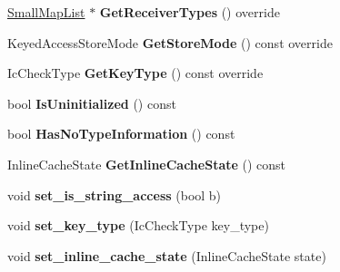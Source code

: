 \begin{DoxyCompactItemize}
\item 
\hyperlink{classv8_1_1internal_1_1_small_map_list}{Small\+Map\+List} $\ast$ {\bfseries Get\+Receiver\+Types} () override\hypertarget{classv8_1_1internal_1_1_property_a1def6a01b668036bf384f768d7e463d4}{}\label{classv8_1_1internal_1_1_property_a1def6a01b668036bf384f768d7e463d4}

\item 
Keyed\+Access\+Store\+Mode {\bfseries Get\+Store\+Mode} () const  override\hypertarget{classv8_1_1internal_1_1_property_a5b06bec35a66845f965bf6764e143211}{}\label{classv8_1_1internal_1_1_property_a5b06bec35a66845f965bf6764e143211}

\item 
Ic\+Check\+Type {\bfseries Get\+Key\+Type} () const  override\hypertarget{classv8_1_1internal_1_1_property_aee4ad8bf59d7852e61d6a1b0b480d1e5}{}\label{classv8_1_1internal_1_1_property_aee4ad8bf59d7852e61d6a1b0b480d1e5}

\item 
bool {\bfseries Is\+Uninitialized} () const \hypertarget{classv8_1_1internal_1_1_property_a0f076d4dbb51d008445be5958d431846}{}\label{classv8_1_1internal_1_1_property_a0f076d4dbb51d008445be5958d431846}

\item 
bool {\bfseries Has\+No\+Type\+Information} () const \hypertarget{classv8_1_1internal_1_1_property_af746c7eb2b0d4e175cf2d518f845acbf}{}\label{classv8_1_1internal_1_1_property_af746c7eb2b0d4e175cf2d518f845acbf}

\item 
Inline\+Cache\+State {\bfseries Get\+Inline\+Cache\+State} () const \hypertarget{classv8_1_1internal_1_1_property_a8cfa0951c07a0e960098858c6c5113df}{}\label{classv8_1_1internal_1_1_property_a8cfa0951c07a0e960098858c6c5113df}

\item 
void {\bfseries set\+\_\+is\+\_\+string\+\_\+access} (bool b)\hypertarget{classv8_1_1internal_1_1_property_ab5b67d21b6185d62d3e9f35c79e88e9b}{}\label{classv8_1_1internal_1_1_property_ab5b67d21b6185d62d3e9f35c79e88e9b}

\item 
void {\bfseries set\+\_\+key\+\_\+type} (Ic\+Check\+Type key\+\_\+type)\hypertarget{classv8_1_1internal_1_1_property_ad2306f38e988cd73ed3e9155454f630e}{}\label{classv8_1_1internal_1_1_property_ad2306f38e988cd73ed3e9155454f630e}

\item 
void {\bfseries set\+\_\+inline\+\_\+cache\+\_\+state} (Inline\+Cache\+State state)\hypertarget{classv8_1_1internal_1_1_property_a1121ed2754cb2ee730c8cbc4ff74f1b6}{}\label{classv8_1_1internal_1_1_property_a1121ed2754cb2ee730c8cbc4ff74f1b6}


\end{DoxyCompactItemize}
